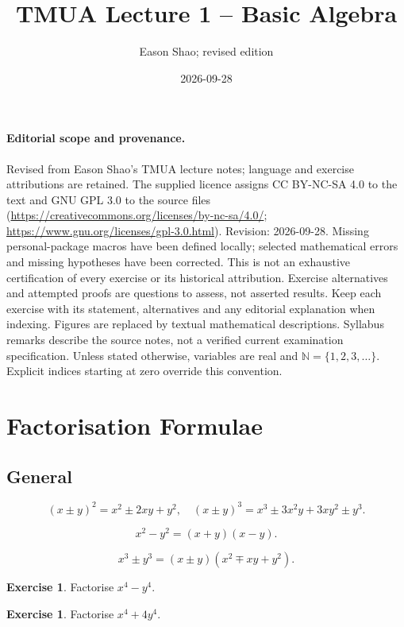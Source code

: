 \documentclass[11pt]{article}
\title{TMUA Lecture 1 -- Basic Algebra}
\author{Eason Shao; revised edition}
\date{2026-09-28}
\theoremstyle{definition}
\newtheorem{example}[theorem]{Exercise}
\theoremstyle{remark}
\newcommand{\pqty}[1]{\left(#1\right)}
\newcommand{\NN}{\mathbb{N}}
\begin{document}
\maketitle
\paragraph{Editorial scope and provenance.}
Revised from Eason Shao's TMUA lecture notes; language and exercise attributions are retained.
The supplied licence assigns CC BY-NC-SA 4.0 to the text and GNU GPL 3.0 to the source files
(\url{https://creativecommons.org/licenses/by-nc-sa/4.0/};
\url{https://www.gnu.org/licenses/gpl-3.0.html}).
Revision: 2026-09-28. Missing personal-package macros have been defined locally;
selected mathematical errors and missing hypotheses have been corrected.
This is not an exhaustive certification of every exercise or its historical attribution.
Exercise alternatives and attempted proofs are questions to assess, not asserted results.
Keep each exercise with its statement, alternatives and any editorial explanation when indexing.
Figures are replaced by textual mathematical descriptions. Syllabus remarks describe the
source notes, not a verified current examination specification.
Unless stated otherwise, variables are real and \(\NN=\{1,2,3,\ldots\}\).
Explicit indices starting at zero override this convention.

\tableofcontents


\section{Factorisation Formulae}\label{tmua-1-section-001}
\subsection{General}\label{tmua-1-subsection-001}
\[
    \pqty{x \pm y}^2 = x^2 \pm 2xy + y^2, \quad \pqty{x \pm y}^3 = x^3 \pm 3 x^2 y + 3 x y^2 \pm y^3.
\]

\[
    x^2 - y^2 = \pqty{x + y} \pqty{x - y}.
\]

\[
    x^3 \pm y^3 = \pqty{x \pm y} \pqty{x^2 \mp xy + y^2}.
\]

\begin{example}\label{tmua-1-unit-001}
    Factorise \(x^4 - y^4\).
\end{example}

\begin{example}\label{tmua-1-unit-002}
    Factorise \(x^4 + 4 y^4\).
\end{example}
\end{document}
